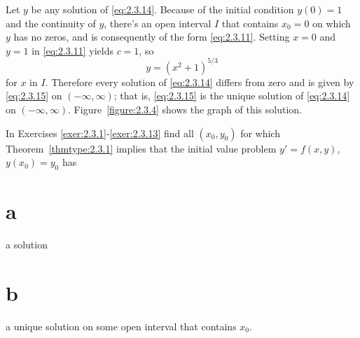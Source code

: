 \begin{examplesolution}
\solution Let $y$ be any solution of \eqref{eq:2.3.14}. Because of the initial condition $y(0)=1$
and the continuity of $y$, there's an open interval $I$ that contains $x_{0}=0$ on which $y$ has no
zeros, and is consequently of the form \eqref{eq:2.3.11}. Setting $x=0$ and $y=1$ in
\eqref{eq:2.3.11} yields $c=1$, so
\begin{equation}
  \label{eq:2.3.15}y=(x^{2}+1)^{5/3}
\end{equation}
for $x$ in $I$. Therefore every solution of \eqref{eq:2.3.14} differs from zero and is given by
\eqref{eq:2.3.15} on $(-\infty,\infty)$; that is, \eqref{eq:2.3.15} is the unique solution of
\eqref{eq:2.3.14} on $(-\infty,\infty)$. Figure~\ref{figure:2.3.4} shows the graph of this solution.
\end{examplesolution}

\exercises In Exercises \ref{exer:2.3.1}-\ref{exer:2.3.13} find all $(x_{0},y_{0})$ for which Theorem~\ref{thmtype:2.3.1} implies that the initial value problem $y'=f(x,y)$, $y(x_{0})=y_{0}$ has \part{a} a solution \part{b} a unique solution on some open interval that contains $x_{0}$.

